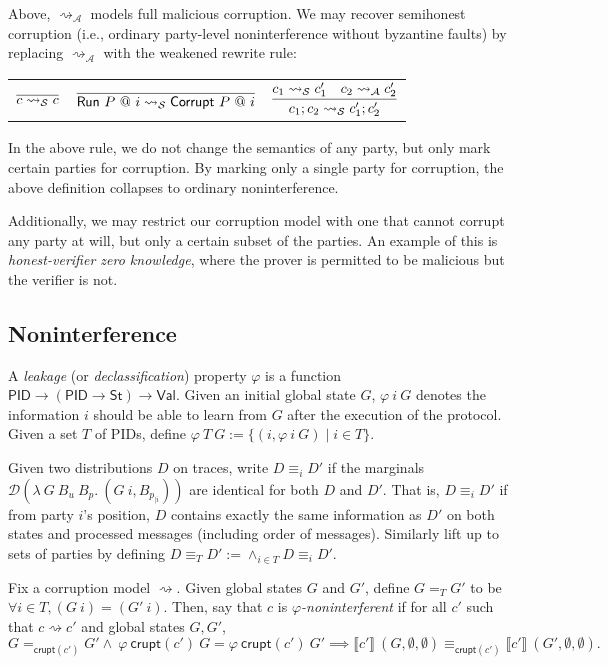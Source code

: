 \documentclass{article}
\newcommand{\Val}{\mathsf{Val}}
\newcommand{\St}{\mathsf{St}}
\newcommand{\PID}{\mathsf{PID}}
\begin{document}
Above, $\rightsquigarrow_\mathcal{A}$ models full malicious corruption. We may recover semihonest corruption (i.e., ordinary party-level noninterference without byzantine faults) by replacing $\rightsquigarrow_\mathcal{A}$ with the weakened rewrite rule:

\begin{tabular}{ccc}
    $\infer{c \rightsquigarrow_{\mathcal{S}} c}{}$ & 
    $\infer{\textsf{Run}\ P\ @\ i \rightsquigarrow_{\mathcal{S}} \textsf{Corrupt}\ P\ @\ i}{}$ &
    $\infer{c_1;c_2 \rightsquigarrow_{\mathcal{S}} c_1'; c_2'} {c_1 \rightsquigarrow_\mathcal{S} c_1' & c_2 \rightsquigarrow_\mathcal{A} c_2'}$ \\
\end{tabular}

In the above rule, we do not change the semantics of any party, but only mark certain parties for corruption. By marking only a single party for corruption, the above definition collapses to ordinary noninterference.

Additionally, we may restrict our corruption model with one that cannot corrupt any party at will, but only a certain subset of the parties. An example of this is \emph{honest-verifier zero knowledge}, where the prover is permitted to be malicious but the verifier is not.

\subsection{Noninterference}

A \emph{leakage} (or \emph{declassification}) property $\varphi$ is a function $\PID \to (\PID \to \St) \to \Val$. Given an initial global state $G$, $\varphi\ i\ G$ denotes the information $i$ should be able to learn from $G$ after the execution of the protocol. Given a set $T$ of PIDs, define $\varphi\ T\ G := \{(i, \varphi\ i\ G) \mid i \in T\}$.

Given two distributions $D$ on traces, write $D \equiv_i D'$ if the marginals $\mathcal{D} (\lambda\ G\ B_u\ B_p.\ (G\ i, B_{p_{| i}}))$ are identical for both $D$ and $D'$. That is, $D \equiv_i D'$ if from party $i$'s position, $D$ contains exactly the same information as $D'$ on both states and processed messages (including order of messages). Similarly lift up to sets of parties by defining $D \equiv_T D' := \wedge_{i \in T} D \equiv_i D'$.


Fix a corruption model $\rightsquigarrow$. Given global states $G$ and $G'$, define $G =_T G'$ to be $\forall i \in T, (G\ i) = (G'\ i).$ Then, say that $c$ is \emph{$\varphi$-noninterferent} if for all $c'$ such that $c \rightsquigarrow c'$ and global states $G, G'$, 
\[ G=_{\mathsf{crupt}(c')}G' \wedge\ \varphi\ \mathsf{crupt}(c')\ G = \varphi\ \mathsf{crupt}(c')\ G' \implies \llbracket c' \rrbracket\ (G, \emptyset, \emptyset) \equiv_{\mathsf{crupt}(c')} \llbracket c' \rrbracket\ (G', \emptyset, \emptyset).\]
\end{document}
